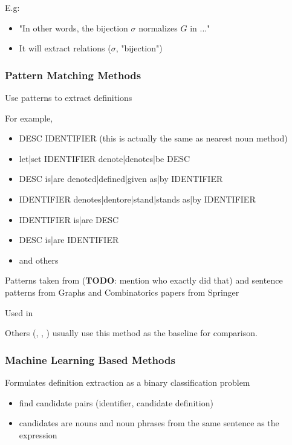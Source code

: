 E.g:

\begin{itemize}
  \item "In other words, the bijection $\sigma$ normalizes $G$ in ..."
  \item It will extract relations ($\sigma$, "bijection")
\end{itemize}



\subsubsection{Pattern Matching Methods}

Use patterns to extract definitions

For example,

\begin{itemize}
  \item DESC IDENTIFIER (this is actually the same as nearest noun method)
  \item let|set IDENTIFIER denote|denotes|be DESC
  \item DESC is|are denoted|defined|given as|by IDENTIFIER
  \item IDENTIFIER denotes|dentore|stand|stands as|by IDENTIFIER
  \item IDENTIFIER is|are DESC
  \item DESC is|are IDENTIFIER
  \item and others
\end{itemize}


Patterns taken from
\cite{trzeciak1995writing} (\textbf{TODO}: mention who exactly did that)
and sentence patterns from Graphs and Combinatorics papers from Springer

Used in \cite{quoc2010mining}

Others (\cite{kristianto2012extracting}, \cite{kristianto2014extracting}, \cite{pagael2014mlp})
usually use this method as the baseline for comparison.


\subsubsection{Machine Learning Based Methods}
Formulates definition extraction as a binary classification problem

\begin{itemize}
  \item find candidate pairs (identifier, candidate definition)
  \item candidates are nouns and noun phrases from the same sentence as the expression
\end{itemize}


